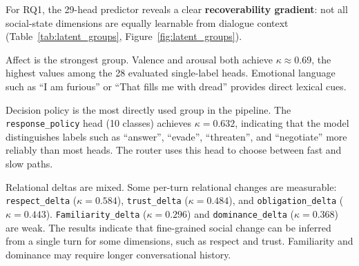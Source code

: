 \documentclass[11pt]{article}
\begin{document}
\begin{table}[t]
\centering
\caption{Per-group latent state prediction metrics (Qwen3-4B, best validation checkpoint; single-seed evaluation on 28 single-label heads; dialogue act is multi-label, excluded here). All $\kappa$ values are true Cohen's $\kappa$ computed from confusion matrices.}
\label{tab:latent_groups}
\small
{}
\end{table}

For RQ1, the 29-head predictor reveals a clear \textbf{recoverability gradient}: not all social-state dimensions are equally learnable from dialogue context (Table~\ref{tab:latent_groups}, Figure~\ref{fig:latent_groups}).

Affect is the strongest group. Valence and arousal both achieve $\kappa{\approx}0.69$, the highest values among the 28 evaluated single-label heads.
Emotional language such as ``I am furious'' or ``That fills me with dread'' provides direct lexical cues.

Decision policy is the most directly used group in the pipeline. The \texttt{response\_policy} head (10 classes) achieves $\kappa{=}0.632$, indicating that the model distinguishes labels such as ``answer'', ``evade'', ``threaten'', and ``negotiate'' more reliably than most heads.
The router uses this head to choose between fast and slow paths.

Relational deltas are mixed. Some per-turn relational changes are measurable: \texttt{respect\_delta} ($\kappa{=}0.584$), \texttt{trust\_delta} ($\kappa{=}0.484$), and \texttt{obligation\_delta} ($\kappa{=}0.443$). \texttt{Familiarity\_delta} ($\kappa{=}0.296$) and \texttt{dominance\_delta} ($\kappa{=}0.368$) are weak.
The results indicate that fine-grained social change can be inferred from a single turn for some dimensions, such as respect and trust. Familiarity and dominance may require longer conversational history.
\end{document}
